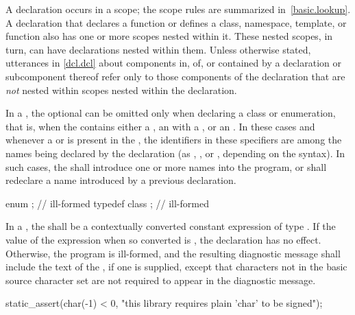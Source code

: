 \pnum
{}%
%
A declaration occurs in a scope; the scope rules are
summarized in~\ref{basic.lookup}. A declaration that declares a function
or defines a class, namespace, template, or function also has one or
more scopes nested within it. These nested scopes, in turn, can have
declarations nested within them. Unless otherwise stated, utterances in
\ref{dcl.dcl} about components in, of, or contained by a
declaration or subcomponent thereof refer only to those components of
the declaration that are \emph{not} nested within scopes nested within
the declaration.

\pnum
{}%
%
In a , the optional
 can be omitted only when declaring a
class or enumeration, that is,
when the  contains either a
, an  with
a , or an
. In these cases and whenever a
 or  is present in
the , the identifiers in these specifiers
are among the names being declared by the declaration (as
, , or
, depending on the syntax). In such cases,
the  shall introduce one or more names into
the program, or shall redeclare a name introduced by a previous
declaration.
\begin{example}
\begin{codeblock}
enum { };           // ill-formed
typedef class { };  // ill-formed
\end{codeblock}
\end{example}

\pnum
{}%
In a , the
 shall be
a contextually converted constant expression
of type .
If the value of the expression when
so converted is , the declaration has no
effect. Otherwise, the program is ill-formed, and the resulting
diagnostic message shall include the text of
the , if one is supplied,
except that characters not in the basic
source character set are not required to appear in
the diagnostic message.
\begin{example}

\begin{codeblock}
static_assert(char(-1) < 0, "this library requires plain 'char' to be signed");
\end{codeblock}\end{example}

